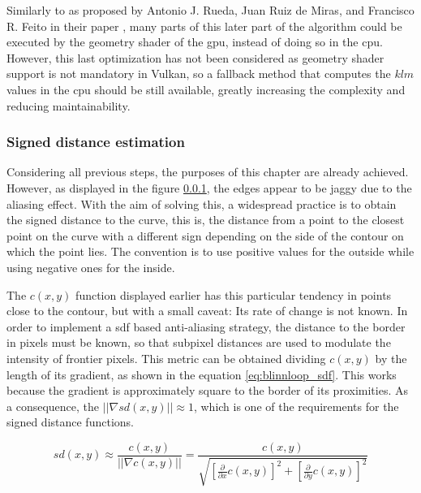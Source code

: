 \documentclass[\topdir/main.tex]{subfiles}
\begin{document}
Similarly to as proposed by Antonio J. Rueda, Juan Ruiz de Miras, and Francisco R. Feito in their paper \cite{ruedaruizfeito2008}, many parts of this later part of the algorithm could be executed by the geometry shader of the \gls{gpu}, instead of doing so in the \gls{cpu}. However, this last optimization has not been considered as geometry shader support is not mandatory in Vulkan, so a fallback method that computes the $klm$ values in the \gls{cpu} should be still available, greatly increasing the complexity and reducing maintainability.\newline 

\subsubsection{Signed distance estimation}
Considering all previous steps, the purposes of this chapter are already achieved. However, as displayed in the figure \ref{}, the edges appear to be jaggy due to the aliasing effect. With the aim of solving this, a widespread practice is to obtain the signed distance to the curve, this is, the distance from a point to the closest point on the curve with a different sign depending on the side of the contour on which the point lies. The convention is to use positive values for the outside while using negative ones for the inside.\newline

The $c(x, y)$ function displayed earlier has this particular tendency in points close to the contour, but with a small caveat: Its rate of change is not known. In order to implement a \gls{sdf} based anti-aliasing strategy, the distance to the border in pixels must be known, so that subpixel distances are used to modulate the intensity of frontier pixels. This metric can be obtained dividing $c(x, y)$ by the length of its gradient, as shown in the equation \eqref{eq:blinnloop_sdf}. This works because the gradient is approximately square to the border of its proximities. As a consequence, the $||\nabla sd(x, y)|| \approx 1$, which is one of the requirements for the signed distance functions.\newline

\begin{equation} \label{eq:blinnloop_sdf}
    sd(x, y) \approx \frac{c(x, y)}{||\nabla c(x, y)||} = \frac{c(x, y)}{\sqrt{[\frac{\partial}{\partial x} c(x, y)]^2 + [\frac{\partial}{\partial y} c(x, y)]^2}}
\end{equation}
        
\end{document}
